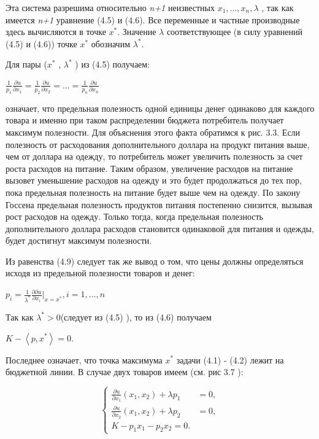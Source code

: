 \documentclass[12pt, 4paper]{book}
\begin{document}
{Эта система разрешима относительно \textit{n+1} неизвестных $x_1,...,x_n, \lambda$ , так как имеется \textit{n+1} уравнение (4.5) и (4.6). Все переменные и частные производные здесь вычисляются в точке  $x^{*}$. Значение $\lambda$ соответствующее (в силу уравнений (4.5) и (4.6)) точке $x^{*}$ обозначим  $\lambda^{*}$.
\par

Для пары ($x^{*}$ , $\lambda^{*}$ ) из (4.5) получаем: 
\begin{center}
$\frac{1}{p_1} \frac{\partial u}{\partial x_1}=\frac{1}{p_2}\frac{\partial u}{\partial x_2}= ... = \frac{1}{p_n}\frac{\partial u}{\partial x_n}$
\end{center}
\par
означает, что предельная полезность одной единицы денег одинаково для каждого товара и именно при таком распределении бюджета потребитель получает максимум полезности. Для объяснения этого факта обратимся к рис. 3.3. Если полезность от расходования дополнительного доллара на продукт питания выше, чем от доллара на одежду, то потребитель может увеличить полезность за счет роста расходов на питание. Таким образом, увеличение расходов на питание вызовет уменьшение расходов на одежду и это будет продолжаться до тех пор, пока предельная полезность на питание будет выше чем на одежду. По закону Госсена предельная полезность продуктов питания постепенно снизится, вызывая рост расходов на одежду. Только тогда, когда предельная полезность дополнительного доллара расходов становится одинаковой для питания и одежды, будет достигнут максимум полезности.
\par

Из равенства (4.9) следует так же вывод о том, что цены должны определяться исходя из предельной полезности товаров и денег: 
\begin{center}
$p_i=\frac{1}{\lambda^{*}}\frac{\partial \partial u}{\partial x_i}|_{x=x^{*}}, i = 1,...,n$
\end{center}
\begin{center}
Так как $\lambda^{*}>0$(следует из (4.5) ), то из (4.6) получаем 
\end{center}
\begin{center}
$K - \left\langle p,x^{*}\right\rangle = 0$.
\end{center}
\par

Последнее означает, что точка максимума $x^{*}$ задачи (4.1) - (4.2) лежит на бюджетной линии. В случае двух товаров имеем (см. рис 3.7 ): 
\begin{center}
$$\left\{
\begin{aligned}
\frac{\partial u}{\partial x_1}(x_1,x_2)+\lambda p_1 & = 0,\\
\frac{\partial u}{\partial x_2}(x_1,x_2)+\lambda p_2 & = 0,\\
K-p_1 x_1 - p_2 x_2 = 0. 
\end{aligned}
\right.$$
\end{center}
\par

}
\end{document}

